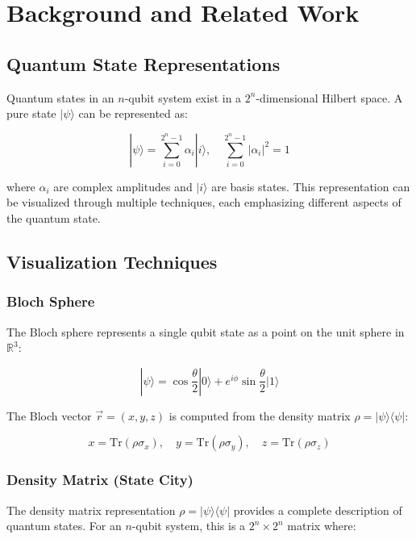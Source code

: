 \documentclass[12pt,a4paper]{article}
\begin{document}
\newpage

\section{Background and Related Work}

\subsection{Quantum State Representations}

Quantum states in an $n$-qubit system exist in a $2^n$-dimensional Hilbert space. A pure state $|\psi\rangle$ can be represented as:

\begin{equation}
	|\psi\rangle = \sum_{i=0}^{2^n-1} \alpha_i |i\rangle, \quad \sum_{i=0}^{2^n-1} |\alpha_i|^2 = 1
\end{equation}

where $\alpha_i$ are complex amplitudes and $|i\rangle$ are basis states. This representation can be visualized through multiple techniques, each emphasizing different aspects of the quantum state.

\subsection{Visualization Techniques}

\subsubsection{Bloch Sphere}
The Bloch sphere represents a single qubit state as a point on the unit sphere in $\mathbb{R}^3$:

\begin{equation}
	|\psi\rangle = \cos\frac{\theta}{2}|0\rangle + e^{i\phi}\sin\frac{\theta}{2}|1\rangle
\end{equation}

The Bloch vector $\vec{r} = (x, y, z)$ is computed from the density matrix $\rho = |\psi\rangle\langle\psi|$:

\begin{equation}
	x = \text{Tr}(\rho\sigma_x), \quad y = \text{Tr}(\rho\sigma_y), \quad z = \text{Tr}(\rho\sigma_z)
\end{equation}

\subsubsection{Density Matrix (State City)}
The density matrix representation $\rho = |\psi\rangle\langle\psi|$ provides a complete description of quantum states. For an $n$-qubit system, this is a $2^n \times 2^n$ matrix where:
\end{document}
